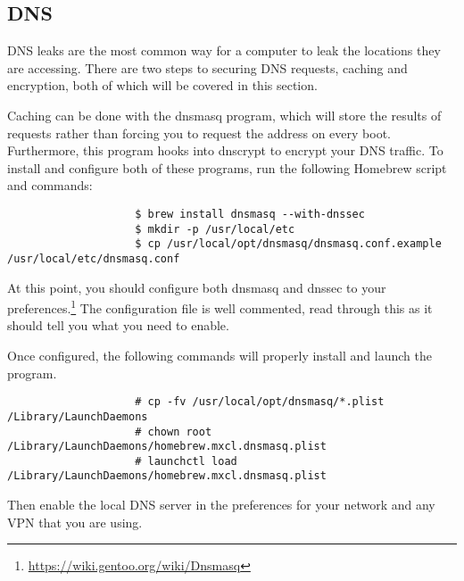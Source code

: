 			\subsection{DNS}
				DNS leaks are the most common way for a computer to leak the locations they are accessing.
				There are two steps to securing DNS requests, caching and encryption, both of which will be covered in this section.

				Caching can be done with the dnsmasq program, which will store the results of requests rather than forcing you to request the address on every boot.
				Furthermore, this program hooks into dnscrypt to encrypt your DNS traffic.
				To install and configure both of these programs, run the following Homebrew script and commands:
				\begin{verbatim}
					$ brew install dnsmasq --with-dnssec
					$ mkdir -p /usr/local/etc
					$ cp /usr/local/opt/dnsmasq/dnsmasq.conf.example /usr/local/etc/dnsmasq.conf
				\end{verbatim}
				At this point, you should configure both dnsmasq and dnssec to your preferences.\footnote{\url{https://wiki.gentoo.org/wiki/Dnsmasq}}
				The configuration file is well commented, read through this as it should tell you what you need to enable.

				Once configured, the following commands will properly install and launch the program.
				\begin{verbatim}
					# cp -fv /usr/local/opt/dnsmasq/*.plist /Library/LaunchDaemons
					# chown root /Library/LaunchDaemons/homebrew.mxcl.dnsmasq.plist
					# launchctl load /Library/LaunchDaemons/homebrew.mxcl.dnsmasq.plist
				\end{verbatim}
				Then enable the local DNS server in the preferences for your network and any VPN that you are using.

